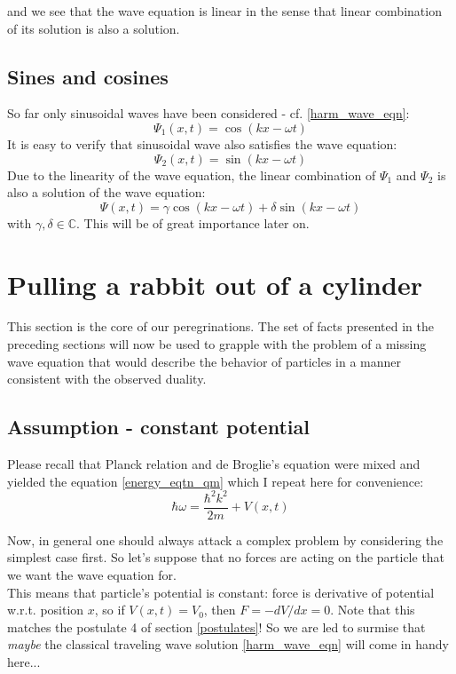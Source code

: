 \documentclass[12pt]{article}
\begin{document}
and we see that the wave equation is linear in the sense that linear combination of its solution is also a solution.


\subsection{Sines and cosines}
\label{sines_and_cosines}
So far only sinusoidal waves have been considered - cf. \eqref{harm_wave_eqn}:
\begin{equation*}
\Psi_1(x, t) = \cos (kx - \omega t)
\end{equation*}
It is easy to verify that sinusoidal wave also satisfies the wave equation:
\begin{equation*}
\Psi_2(x, t) = \sin(kx - \omega t)
\end{equation*}
Due to the linearity of the wave equation, the linear combination of $\Psi_1$ and $\Psi_2$ is also a solution of the wave equation:
\begin{equation}
\label{linear_combination_waves}
\Psi(x, t) = \gamma \cos (kx - \omega t) + \delta \sin (kx - \omega t)
\end{equation}
with $\gamma, \delta \in \mathbb{C}$. This will be of great importance later on.



\section{Pulling a rabbit out of a cylinder}
This section is the core of our peregrinations. The set of facts 
presented in the preceding sections will now be used to grapple with the problem of a missing wave equation that would describe the behavior of 
particles in a manner consistent with the observed duality.

\subsection{Assumption - constant potential}
Please recall that Planck relation and de Broglie's equation were mixed
and yielded the equation \eqref{energy_eqtn_qm} which I repeat here for convenience:
\begin{equation*}
\hbar \omega = \frac{\hbar^2 k^2}{2m} + V(x, t)
\end{equation*}

\indent Now, in general one should always attack a complex problem by considering the simplest case first. So let's suppose that no 
forces are acting on the particle that we want the wave equation for. 
\\ \indent This means that particle's potential is constant: force is derivative of 
 potential w.r.t. position $x$, so if $V(x, t) = V_0$, then $F = -dV/dx = 0$. 
 Note that this matches the postulate 4 of section \ref{postulates}! 
 So we are led to 
 surmise that \textit{maybe} the classical traveling wave solution  \eqref{harm_wave_eqn} will come in handy 
 here... 
\end{document}
